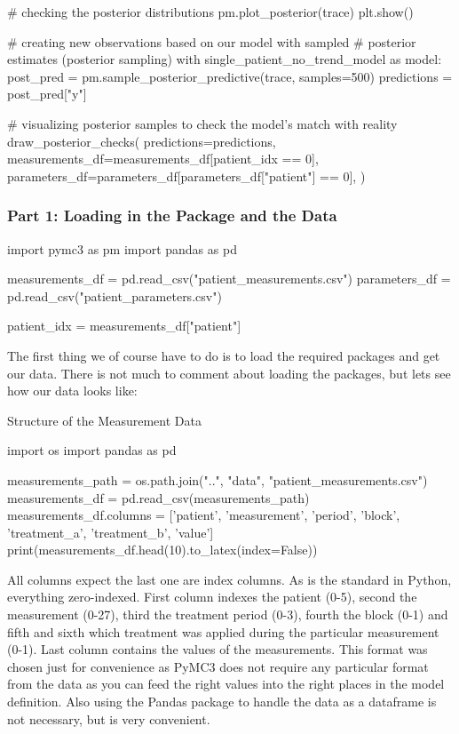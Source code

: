 \documentclass[12pt,a4paper,leqno]{report}
\theoremstyle{plain}
\theoremstyle{definition}
\theoremstyle{remark}
\begin{document}
\begin{pyverbatim}[][fontsize=\footnotesize]
    # checking the posterior distributions
    pm.plot_posterior(trace)
    plt.show()

 
# creating new observations based on our model with sampled
# posterior estimates (posterior sampling)
with single_patient_no_trend_model as model:
    post_pred = pm.sample_posterior_predictive(trace, samples=500)
    predictions = post_pred["y"]

# visualizing posterior samples to check the model's match with reality
draw_posterior_checks(
    predictions=predictions,
    measurements_df=measurements_df[patient_idx == 0],
    parameters_df=parameters_df[parameters_df["patient"] == 0],
)
\end{pyverbatim}
\smallskip

\subsubsection*{Part 1: Loading in the Package and the Data}

\bigskip
\begin{pyverbatim}[][fontsize=\footnotesize]
import pymc3 as pm
import pandas as pd

measurements_df = pd.read_csv("patient_measurements.csv")
parameters_df = pd.read_csv("patient_parameters.csv")

patient_idx = measurements_df["patient"]
\end{pyverbatim}
\smallskip

The first thing we of course have to do is to load the required packages and get our data. There is
not much to comment about loading the packages, but lets see how our data looks like:

\bigskip
\begin{table}[H]
\caption{Structure of the Measurement Data}\label{measurements}
\bigskip
\centering
\begin{pycode}
import os
import pandas as pd

measurements_path = os.path.join("..", "data", "patient_measurements.csv")
measurements_df = pd.read_csv(measurements_path)
measurements_df.columns = ['patient', 'measurement', 'period', 'block',
'treatment_a', 'treatment_b', 'value']
print(measurements_df.head(10).to_latex(index=False))
\end{pycode}
\end{table}
\bigskip

All columns expect the last one are index columns. As is the standard in Python, everything
zero-indexed. First column indexes the patient (0-5), second the
measurement (0-27), third the treatment period (0-3), fourth the block (0-1) and fifth
and sixth which treatment was applied during the particular measurement (0-1). Last
column contains the values of the measurements. This format was chosen just for
convenience as PyMC3 does not require any particular format from the
data as you can feed the right values into
the right places in the model definition. Also using the Pandas package to handle the
data as a dataframe is not necessary, but is very convenient.
\end{document}
